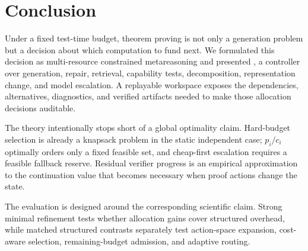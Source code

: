 \section{Conclusion}

Under a fixed test-time budget, theorem proving is not only a generation
problem but a decision about which computation to fund next. We formulated
this decision as multi-resource constrained metareasoning and presented
\system, a controller over generation, repair, retrieval, capability tests,
decomposition, representation change, and model escalation. A replayable
workspace exposes the dependencies, alternatives, diagnostics, and verified
artifacts needed to make those allocation decisions auditable.

The theory intentionally stops short of a global optimality claim. Hard-budget
selection is already a knapsack problem in the static independent case;
\(p_i/c_i\) optimally orders only a fixed feasible set, and cheap-first
escalation requires a feasible fallback reserve. Residual verifier progress is
an empirical approximation to the continuation value that becomes necessary
when proof actions change the state.

The evaluation is designed around the corresponding scientific claim. Strong
minimal refinement tests whether allocation gains cover structured overhead,
while matched structured contrasts separately test action-space expansion,
cost-aware selection, remaining-budget admission, and adaptive routing.
